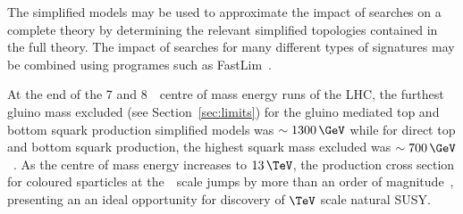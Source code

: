The simplified models may be used to approximate the impact of searches on a complete theory 
by determining the relevant simplified topologies contained in the full theory. The impact
of searches for many different types of signatures may be combined using programes 
such as FastLim~\cite{Fastlim}.

At the end of the 7 and 8~\TeV~centre of mass energy runs of the LHC, the furthest
gluino mass excluded (see Section~\ref{sec:limits}) for the gluino mediated top and bottom 
squark production simplified models was $\sim 1300\,\GeV$ while for direct top and 
bottom squark production, the highest squark mass excluded was $\sim 700\,\GeV$~\cite{limits8}. 
As the centre of mass energy increases to $13\,\TeV$, the production cross section for coloured sparticles
at the~\TeV~scale jumps by more than an order of magnitude~\cite{snowmass}, presenting an
an ideal opportunity for discovery of $\TeV$ scale natural SUSY.




